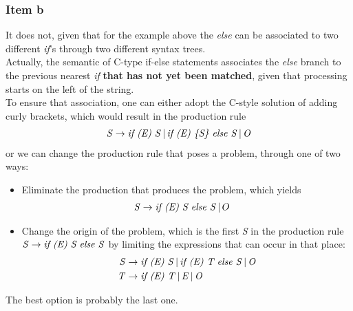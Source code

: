 {\subsubsection{Item b}
It does not, given that for the example above the \textit{else} can be associated to two different \textit{if}'s through two different syntax trees.\\
Actually, the semantic of C-type if-else statements associates the \textit{else} branch to the previous nearest \textit{if} \textbf{that has not yet been matched}, given that processing starts on the left of the string.\\
To ensure that association, one can either adopt the C-style solution of adding curly brackets, which would result in the production rule
\begin{alignat*}{2}
	\text{\textit{S}} \rightarrow \text{\textit{if (E) S}}\,|\,\text{\textit{if (E) \{S\} else S}}\,|\,\text{\textit{O}}
\end{alignat*}
or we can change the production rule that poses a problem, through one of two ways:
\begin{itemize}
	\item Eliminate the production that produces the problem, which yields
	\begin{alignat*}{2}
		\text{\textit{S}} &\rightarrow \text{\textit{if (E) S else S}}\,|\,O
	\end{alignat*}
	\item Change the origin of the problem, which is the first \textit{S} in the production rule $\text{\textit{S}} \rightarrow \text{\textit{if (E) S else S}}$ by limiting the expressions that can occur in that place:
	\begin{alignat*}{2}
		\text{\textit{S}} &\rightarrow \text{\textit{if (E) S}}\,|\,\text{\textit{if (E) T else S}}\,|\,\text{\textit{O}}\\
		\text{\textit{T}} &\rightarrow \text{\textit{if (E) T}}\,|\,\text{\textit{E}}\,|\,\text{\textit{O}}
	\end{alignat*}
\end{itemize}
The best option is probably the last one.
}
